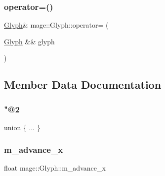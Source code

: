 \hypertarget{structmage_1_1_glyph_a28a3279f2e142e4b771295d64d7cb414}{}\label{structmage_1_1_glyph_a28a3279f2e142e4b771295d64d7cb414} 
\subsubsection{\texorpdfstring{operator=()}{operator=()}\hspace{0.1cm}{\footnotesize\ttfamily [2/2]}}
{\footnotesize\ttfamily \hyperlink{structmage_1_1_glyph}{Glyph}\& mage\+::\+Glyph\+::operator= (\begin{DoxyParamCaption}\item[{\hyperlink{structmage_1_1_glyph}{Glyph} \&\&}]{glyph }\end{DoxyParamCaption})\hspace{0.3cm}{\ttfamily [default]}}



\subsection{Member Data Documentation}
\hypertarget{structmage_1_1_glyph_a98d410ece136521b792de6385b823795}{}\label{structmage_1_1_glyph_a98d410ece136521b792de6385b823795} 
\subsubsection{\texorpdfstring{"@2}{@2}}
{\footnotesize\ttfamily union \{ ... \} }

\hypertarget{structmage_1_1_glyph_ab15dfce26541919696c1e6232d6c0cb6}{}\label{structmage_1_1_glyph_ab15dfce26541919696c1e6232d6c0cb6} 
\subsubsection{\texorpdfstring{m\+\_\+advance\+\_\+x}{m\_advance\_x}}
{\footnotesize\ttfamily float mage\+::\+Glyph\+::m\+\_\+advance\+\_\+x}

\hypertarget{structmage_1_1_glyph_a1942f2164a6829dfbafe8fe09297b387}{}\label{structmage_1_1_glyph_a1942f2164a6829dfbafe8fe09297b387} 
